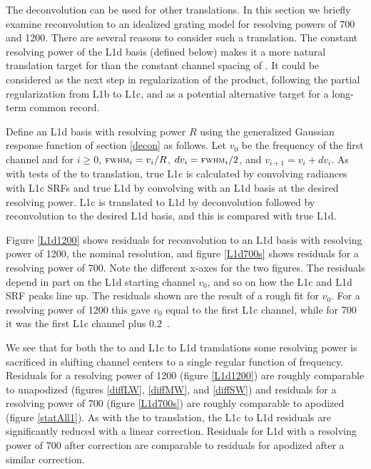 \documentclass[journal]{IEEEtran}
\begin{document}

The {\airs} deconvolution can be used for other translations.  
In this section we briefly examine reconvolution to an idealized
grating model for resolving powers of 700 and 1200.  There are
several reasons to consider such a translation.  The constant
resolving power of the L1d basis (defined below) makes it a more
natural translation target for {\airs} than the constant channel
spacing of {\cris}.  It could be considered as the next step in
regularization of the {\airs} product, following the partial
regularization from L1b to L1c, and as a potential alternative
target for a long-term common record.

Define an {\airs} L1d basis with resolving power $R$ using the
generalized Gaussian response function of section \ref{decon} as
follows.  Let $v_0$ be the frequency of the first channel and for
$i\ge0$, $\mbox{\small\textsc{fwhm}}_i = v_i / R$, $dv_i = \mbox{\small\textsc{fwhm}}_i / 2$, and $v_{i+1} =
v_i + dv_i$.  As with tests of the {\airs} to {\cris} translation,
true L1c is calculated by convolving {\kcarta} radiances with
{\airs} L1c SRFs and true L1d by convolving with an L1d basis at the
desired resolving power.  L1c is translated to L1d by deconvolution
followed by reconvolution to the desired L1d basis, and this is
compared with true L1d.

Figure \ref{L1d1200} shows residuals for reconvolution to an L1d
basis with resolving power of 1200, the nominal {\airs} resolution,
and figure \ref{L1d700s} shows residuals for a resolving power of
700.  Note the different x-axes for the two figures.  The residuals
depend in part on the L1d starting channel $v_0$, and so on how the
L1c and L1d SRF peaks line up.  The residuals shown are the result
of a rough fit for $v_0$.  For a resolving power of 1200 this gave
$v_0$ equal to the first L1c channel, while for 700 it was the first
L1c channel plus $0.2$~\wn.

We see that for both the {\airs} to {\cris} and L1c to L1d
translations some resolving power is sacrificed in shifting channel
centers to a single regular function of frequency.  Residuals for a
resolving power of 1200 (figure \ref{L1d1200}) are roughly
comparable to unapodized {\cris} (figures \ref{diffLW},
\ref{diffMW}, and \ref{diffSW}) and residuals for a resolving power
of 700 (figure \ref{L1d700s}) are roughly comparable to apodized
{\cris} (figure \ref{statAll1}).  As with the {\airs} to {\cris}
translation, the L1c to L1d residuals are significantly reduced with
a linear correction.  Residuals for L1d with a resolving power of
700 after correction are comparable to residuals for apodized
{\cris} after a similar correction.
\end{document}
